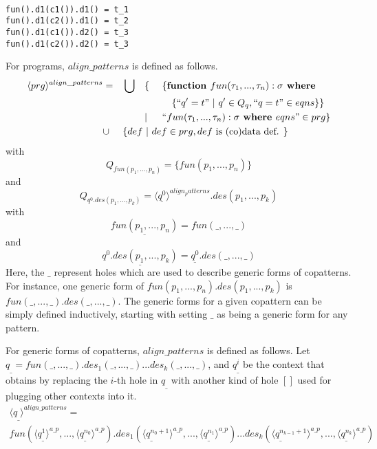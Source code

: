 \begin{lstlisting}

fun().d1(c1()).d1() = t_1
fun().d1(c2()).d1() = t_2
fun().d1(c1()).d2() = t_3
fun().d1(c2()).d2() = t_3

\end{lstlisting}

For programs, $align\_patterns$ is defined as follows.
\begin{alignat*}{4}
\langle prg \rangle^{align\_patterns} & = &&\bigcup &&\{ ~&&\{ \textrm{\textbf{function }} fun(\tau_1, ..., \tau_n): \sigma \textrm{\textbf{ where }} \\
& && && &&\quad \{ `` q' = t " ~ | ~ q' \in Q_q, `` q = t " \in eqns \} \} \\
& && && | && `` fun (\tau_1, ..., \tau_n): \sigma \textrm{\textbf{ where }} eqns " \in prg \} \\
& \cup && \{ def ~ | ~ def \in prg, def \textrm{ is (co)data def. } \} \span\span\span\span
\end{alignat*}
with
\begin{equation*}
Q_{fun(p_1, ..., p_n)} = \{fun(p_1, ..., p_n)\}
\end{equation*}
and
\begin{equation*}
Q_{q^0.des(p_1, ..., p_k)} = \langle \underline{q^0} \rangle^{align_patterns}.des(p_1, ..., p_k)
\end{equation*}
with
\begin{equation*}
\underline{fun(p_1, ..., p_n)} = fun(\_, ..., \_)
\end{equation*}
and
\begin{equation*}
\underline{q^0.des(p_1, ..., p_k)} = \underline{q^0}.des(\_, ..., \_)
\end{equation*}
Here, the $\_$ represent holes which are used to describe generic forms of copatterns. For instance, one generic form of $fun(p_1, ..., p_n).des(p_1, ..., p_k)$ is $fun(\_, ..., \_).des(\_, ..., \_)$. The generic forms for a given copattern can be simply defined inductively, starting with setting $\_$ as being a generic form for any pattern.

For generic forms of copatterns, $align\_patterns$ is defined as follows. Let $q_\_ = fun(\_, ..., \_).des_1(\_, ..., \_)...des_k(\_, ..., \_)$, and $q^i_\_$ be the context that obtains by replacing the $i$-th hole in $q_\_$ with another kind of hole $[]$ used for plugging other contexts into it.
\begin{multline*}
\langle q_\_ \rangle^{align\_patterns} = \\
fun(\langle q^1_\_ \rangle^{a\_p}, ..., \langle q^{n_0}_\_ \rangle^{a\_p}).des_1(\langle q^{n_0 + 1}_\_ \rangle^{a\_p}, ..., \langle q^{n_1}_\_ \rangle^{a\_p})...des_k(\langle q^{n_{k-1} + 1}_\_ \rangle^{a\_p}, ..., \langle q^{n_k}_\_ \rangle^{a\_p})
\end{multline*}

